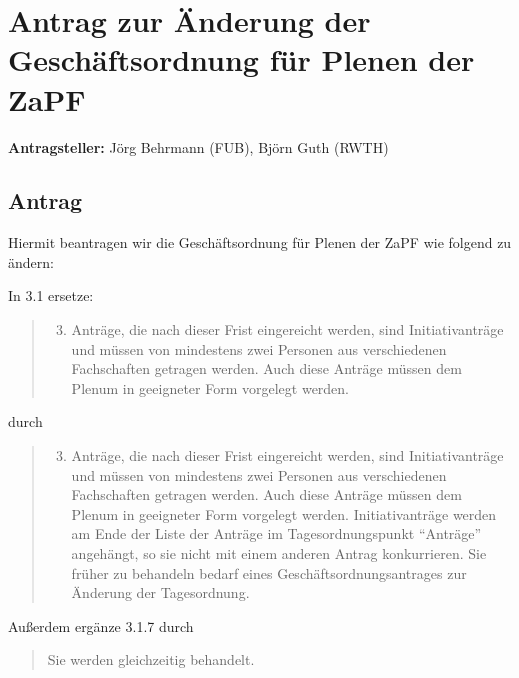 \documentclass[draft,10pt,oneside]{scrartcl}
\begin{document}
\section*{Antrag zur Änderung der Geschäftsordnung für Plenen der ZaPF}

\textbf{Antragsteller:} Jörg Behrmann (FUB), Björn Guth (RWTH)

\subsection*{Antrag}

Hiermit beantragen wir die Geschäftsordnung für Plenen der ZaPF wie folgend zu
ändern:

In 3.1 ersetze:
\begin{quote}
    \begin{enumerate}
        \setcounter{enumi}{2}
        \item Anträge, die nach dieser Frist eingereicht werden, sind
            Initiativanträge und müssen von mindestens zwei Personen aus
            verschiedenen Fachschaften getragen werden. Auch diese Anträge
            müssen dem Plenum in geeigneter Form vorgelegt werden.
    \end{enumerate}
\end{quote}
durch
\begin{quote}
    \begin{enumerate}
        \setcounter{enumi}{2}
        \item Anträge, die nach dieser Frist eingereicht werden, sind
            Initiativanträge und müssen von mindestens zwei Personen aus
            verschiedenen Fachschaften getragen werden.  Auch diese Anträge
            müssen dem Plenum in geeigneter Form vorgelegt werden.
            Initiativanträge werden am Ende der Liste der Anträge im
            Tagesordnungspunkt ``Anträge'' angehängt, so sie nicht mit einem
            anderen Antrag konkurrieren.  Sie früher zu behandeln bedarf eines
            Geschäftsordnungsantrages zur Änderung der Tagesordnung.
    \end{enumerate}
\end{quote}
Außerdem ergänze 3.1.7 durch
\begin{quote}
    Sie werden gleichzeitig behandelt.
\end{quote}
\end{document}
